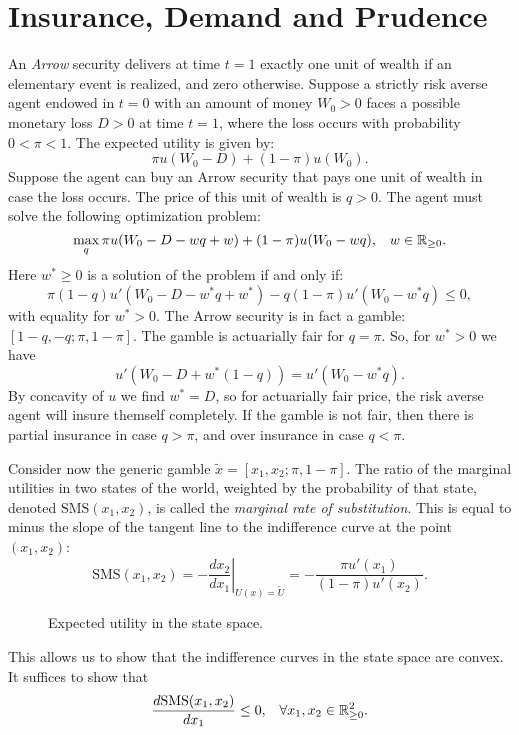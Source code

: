 \documentclass[twoside, titlepage]{article}
\begin{document}
\section{Insurance, Demand and Prudence}
An \textit{Arrow} security delivers at time $t=1$ exactly one unit of wealth if an elementary event is realized, and zero otherwise. Suppose a strictly risk averse agent endowed in $t=0$ with an amount of money $W_0>0$ faces a possible monetary loss $D>0$ at time $t=1$, where the loss occurs with probability $0 < \pi < 1$. The expected utility is given by:
\[
    \pi u(W_0 - D) + (1-\pi)u(W_0).
\]
Suppose the agent can buy an Arrow security that pays one unit of wealth in case the loss occurs. The price of this unit of wealth is $q>0$. The agent must solve the following optimization problem:
\[
    \max_{q} \pi u(W_0 - D - wq + w) + (1-\pi)u(W_0 - wq), \;\;\; w \in \mathbb{R}_{\geq 0}.
\]
Here $w^* \geq 0$ is a solution of the problem if and only if:
\[
    \pi(1-q) u'(W_0 - D - w^*q + w^*) - q(1-\pi)u'(W_0 - w^*q) \leq 0,
\]
with equality for $w^* > 0$. The Arrow security is in fact a gamble: $[1-q, -q; \pi, 1-\pi]$. The gamble is actuarially fair for $q = \pi$. So, for $w^* > 0$ we have
\[
    u'\left(W_0 - D + w^*(1-q)\right) = u'\left(W_0 - w^*q\right).
\]
By concavity of $u$ we find $w^* = D$, so for actuarially fair price, the risk averse agent will insure themself completely. If the gamble is not fair, then there is partial insurance in case $q > \pi$, and over insurance in case $q < \pi$.

Consider now the generic gamble $\tilde{x} = [x_1, x_2; \pi, 1-\pi]$. The ratio of the marginal utilities in two states of the world, weighted by the probability of that state, denoted $\text{SMS}(x_1, x_2)$, is called the \textit{marginal rate of substitution}. This is equal to minus the slope of the tangent line to the indifference curve at the point $(x_1, x_2)$:
\[
    \text{SMS}(x_1, x_2) = \left.-\frac{dx_2}{dx_1}\right|_{U(x) = \tilde{U}} = - \frac{\pi u'(x_1)}{(1-\pi)u'(x_2)}.
\]
\begin{figure}[ht]
    \centering
    \caption{Expected utility in the state space. }
    \label{fig:insurance}
\end{figure}
This allows us to show that the indifference curves in the state space are convex. It suffices to show that
\[
    \frac{d\text{SMS}(x_1, x_2)}{dx_1} \leq 0, \;\;\; \forall x_1, x_2 \in \mathbb{R}^2_{\geq 0}.
\]
\end{document}
